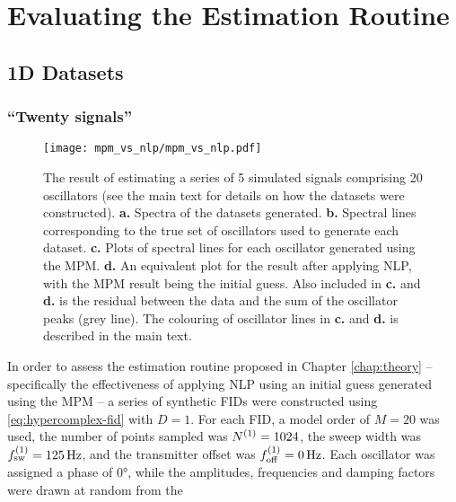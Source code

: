 \section{Evaluating the Estimation Routine}
\label{sec:evaluation}

\subsection{\acs{1D} Datasets}
\label{subsec:onedim}

\subsubsection{``Twenty signals''}
\begin{sidewaysfigure}
    \centering
    \texttt{[image: mpm\_vs\_nlp/mpm\_vs\_nlp.pdf]}
    \caption[
        The result of estimating a series of 5 simulated signals comprising 20
        oscillators, using solely the \acs{MPM} and also with phase
        variance-regularised \acs{NLP} afterwards.
    ]{
        The result of estimating a series of 5 simulated signals comprising 20
        oscillators (see the main text for details on how the datasets were constructed).
        \textbf{a.} Spectra of the datasets generated.
        \textbf{b.} Spectral lines corresponding to the true set of oscillators
        used to generate each dataset.
        \textbf{c.} Plots of spectral lines for each oscillator generated using
        the \acs{MPM}.
        \textbf{d.} An equivalent plot for the result after applying \acs{NLP},
        with the \ac{MPM} result being the initial guess.
        Also included in \textbf{c.} and \textbf{d.} is the residual between the
        data and the sum of the oscillator peaks (grey line).
        The colouring of oscillator lines in \textbf{c.} and \textbf{d.} is
        described in the main text.
    }
    \label{fig:mpm_vs_nlp}
\end{sidewaysfigure}
In order to assess the estimation routine proposed in Chapter \ref{chap:theory}
-- specifically the effectiveness of applying \ac{NLP} using an initial guess
generated using the \ac{MPM} -- a series of synthetic \acp{FID} were constructed
using \eqref{eq:hypercomplex-fid} with $D=1$. For each \ac{FID}, a model order
of $M=20$ was used, the number of points sampled was $N^{(1)} = 1024$, the sweep
width was $f_{\mathrm{sw}}^{(1)}=\qty{125}{\hertz}$, and the transmitter offset was $f_{\mathrm{off}}^{(1)}
= \qty{0}{\hertz}$.  Each oscillator was assigned a phase of \ang{0}, while the
amplitudes, frequencies and damping factors were drawn at random from the
